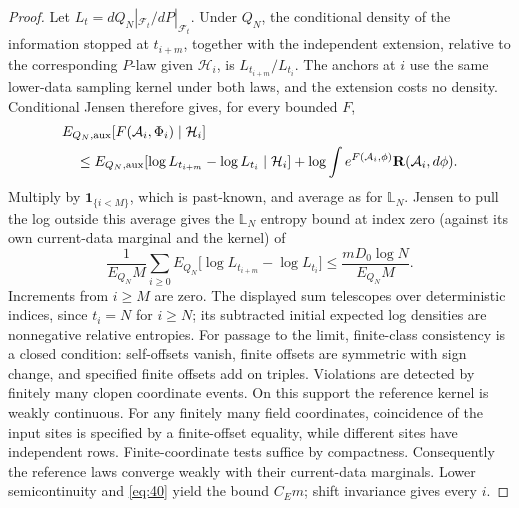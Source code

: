 \begin{proof}
Let \(L_t=dQ_N|_{\mathcal F_t}/dP|_{\mathcal F_t}\). Under \(Q_N\),
the conditional density of the information stopped at \(t_{i+m}\),
together with the independent extension, relative to the corresponding
\(P\)-law given \(\mathcal H_i\), is \(L_{t_{i+m}}/L_{t_i}\).
The anchors at \(i\) use the same lower-data sampling kernel under both
laws, and the extension costs no density. Conditional Jensen therefore
gives, for every bounded \(F\),
\[
\begin{aligned}
&E_{Q_N,{\rm aux}}[F(\mathcal A_i,\Phi_i)\mid\mathcal H_i]\\
&\quad\le
E_{Q_N,{\rm aux}}[\log L_{t_{i+m}}-\log L_{t_i}\mid\mathcal H_i]
+\log\int e^{F(\mathcal A_i,\phi)}\mathbf R(\mathcal A_i,d\phi).
\end{aligned}
\]
Multiply by \(\mathbf1_{\{i<M\}}\), which is past-known, and average as for \(\mathbb L_N\). Jensen to pull the log outside this average gives the \(\mathbb L_N\) entropy bound at index zero (against its own current-data marginal and the kernel) of
\[
\frac{1}{E_{Q_N}M}\sum_{i\ge0}E_{Q_N}\big[\log L_{t_{i+m}}-\log L_{t_i}\big]
\le \frac{mD_0\log N}{E_{Q_N}M}.
\]
Increments from \(i\ge M\) are zero. The displayed sum telescopes
over deterministic indices, since \(t_i=N\) for \(i\ge N\); its
subtracted initial expected log densities are nonnegative relative
entropies. For passage to the limit, finite-class consistency is a
closed condition: self-offsets vanish, finite offsets are symmetric
with sign change, and specified finite offsets add on triples.
Violations are detected by finitely many clopen coordinate events.
On this support the reference kernel is weakly continuous. For any
finitely many field coordinates, coincidence of the input sites is
specified by a finite-offset equality, while different sites have
independent rows. Finite-coordinate tests suffice by compactness.
Consequently the reference laws converge weakly with their current-data
marginals. Lower semicontinuity and \eqref{eq:40} yield the bound
\(C_E m\); shift invariance gives every \(i\).
\end{proof}


